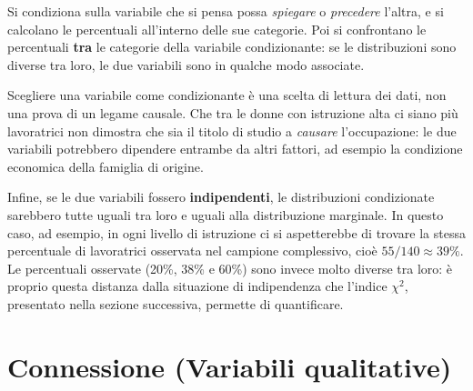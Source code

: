 \documentclass[
  a4paper,
  DIV=11,
  numbers=noendperiod]{scrreprt}
\begin{document}
\begin{tcolorbox}[enhanced jigsaw, toprule=.15mm, left=2mm, leftrule=.75mm, breakable, coltitle=black, title={Una regola pratica}, bottomtitle=1mm, opacitybacktitle=0.6, toptitle=1mm, titlerule=0mm, bottomrule=.15mm, colframe=quarto-callout-tip-color-frame, arc=.35mm, rightrule=.15mm, opacityback=0, colbacktitle=quarto-callout-tip-color!10!white, colback=white]

Si condiziona sulla variabile che si pensa possa \emph{spiegare} o
\emph{precedere} l'altra, e si calcolano le percentuali all'interno
delle sue categorie. Poi si confrontano le percentuali \textbf{tra} le
categorie della variabile condizionante: se le distribuzioni sono
diverse tra loro, le due variabili sono in qualche modo associate.

\end{tcolorbox}

\begin{tcolorbox}[enhanced jigsaw, toprule=.15mm, left=2mm, leftrule=.75mm, breakable, coltitle=black, title={Condizionare non vuol dire dimostrare una causa}, bottomtitle=1mm, opacitybacktitle=0.6, toptitle=1mm, titlerule=0mm, bottomrule=.15mm, colframe=quarto-callout-warning-color-frame, arc=.35mm, rightrule=.15mm, opacityback=0, colbacktitle=quarto-callout-warning-color!10!white, colback=white]

Scegliere una variabile come condizionante è una scelta di lettura dei
dati, non una prova di un legame causale. Che tra le donne con
istruzione alta ci siano più lavoratrici non dimostra che sia il titolo
di studio a \emph{causare} l'occupazione: le due variabili potrebbero
dipendere entrambe da altri fattori, ad esempio la condizione economica
della famiglia di origine.

\end{tcolorbox}

Infine, se le due variabili fossero \textbf{indipendenti}, le
distribuzioni condizionate sarebbero tutte uguali tra loro e uguali alla
distribuzione marginale. In questo caso, ad esempio, in ogni livello di
istruzione ci si aspetterebbe di trovare la stessa percentuale di
lavoratrici osservata nel campione complessivo, cioè
\(55/140 \approx 39\%\). Le percentuali osservate (20\%, 38\% e 60\%)
sono invece molto diverse tra loro: è proprio questa distanza dalla
situazione di indipendenza che l'indice \(\chi^2\), presentato nella
sezione successiva, permette di quantificare.

\section{Connessione (Variabili
qualitative)}\label{connessione-variabili-qualitative}
\end{document}
